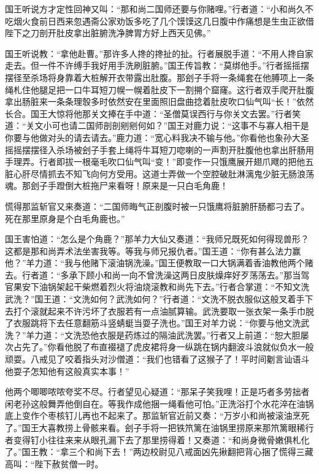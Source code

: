 \documentclass[12pt,UTF8]{ctexbook}
\begin{document}
{国王听说方才定性回神又叫：“那和尚二国师还要与你赌哩。”行者道：“小和尚久不吃烟火食前日西来忽遇斋公家劝饭多吃了几个馍馍这几日腹中作痛想是生虫正欲借陛下之刀剖开肚皮拿出脏腑洗净脾胃方好上西天见佛。”

国王听说教：“拿他赴曹。”那许多人搀的搀扯的扯。行者展脱手道：“不用人搀自家走去。但一件不许缚手我好用手洗刷脏腑。”国王传旨教：“莫绑他手。”行者摇摇摆摆径至杀场将身靠着大桩解开衣带露出肚腹。那刽子手将一条绳套在他膊项上一条绳札住他腿足把一口牛耳短刀幌一幌着肚皮下一割搠个窟窿。这行者双手爬开肚腹拿出肠脏来一条条理彀多时依然安在里面照旧盘曲捻着肚皮吹口仙气叫“长！”依然长合。国王大惊将他那关文捧在手中道：“圣僧莫误西行与你关文去罢。”行者笑道：“关文小可也请二国师剖剖剜剜何如？”国王对鹿力说：“这事不与寡人相干是你要与他做对头的请去请去。”鹿力道：“宽心料我决不输与他。”你看他也象孙大圣摇摇摆摆径入杀场被刽子手套上绳将牛耳短刀唿喇的一声割开肚腹他也拿出肝肠用手理弄。行者即拔一根毫毛吹口仙气叫“变！”即变作一只饿鹰展开翅爪飕的把他五脏心肝尽情抓去不知飞向何方受用。这道士弄做一个空腔破肚淋漓鬼少脏无肠浪荡魂。那刽子手蹬倒大桩拖尸来看呀！原来是一只白毛角鹿！

慌得那监斩官又来奏道：“二国师晦气正剖腹时被一只饿鹰将脏腑肝肠都刁去了。死在那里原身是个白毛角鹿也。”

国王害怕道：“怎么是个角鹿？”那羊力大仙又奏道：“我师兄既死如何得现兽形？这都是那和尚弄术法坐害我等。等我与师兄报仇者。”国王道：“你有甚么法力赢他？”羊力道：“我与他赌下滚油锅洗澡。”国王便教取一口大锅满着香油教他两个赌去。行者道：“多承下顾小和尚一向不曾洗澡这两日皮肤燥痒好歹荡荡去。”那当驾官果安下油锅架起干柴燃着烈火将油烧滚教和尚先下去。”行者合掌道：“不知文洗武洗？”国王道：“文洗如何？武洗如何？”行者道：“文洗不脱衣服似这般叉着手下去打个滚就起来不许污坏了衣服若有一点油腻算输。武洗要取一张衣架一条手巾脱了衣服跳将下去任意翻筋斗竖蜻蜓当耍子洗也。”国王对羊力说：“你要与他文洗武洗？”羊力道：“文洗恐他衣服是药炼过的隔油武洗罢。”行者又上前道：“恕大胆屡次占先了。”你看他脱了布直裰褪了虎皮裙将身一纵跳在锅内翻波斗浪就似负水一般顽耍。八戒见了咬着指头对沙僧道：“我们也错看了这猴子了！平时间劖言讪语斗他耍子怎知他有这般真实本事！”

他两个唧唧哝哝夸奖不尽。行者望见心疑道：“那呆子笑我哩！正是巧者多劳拙者闲老孙这般舞弄他倒自在。等我作成他捆一绳看他可怕。”正洗浴打个水花淬在油锅底上变作个枣核钉儿再也不起来了。那监斩官近前又奏：“万岁小和尚被滚油烹死了。”国王大喜教捞上骨骸来看。刽子手将一把铁笊篱在油锅里捞原来那笊篱眼稀行者变得钉小往往来来从眼孔漏下去了那里捞得着！又奏道：“和尚身微骨嫩俱札化了。”国王教：“拿三个和尚下去！”两边校尉见八戒面凶先揪翻把背心捆了慌得三藏高叫：“陛下赦贫僧一时。

}
\end{document}
